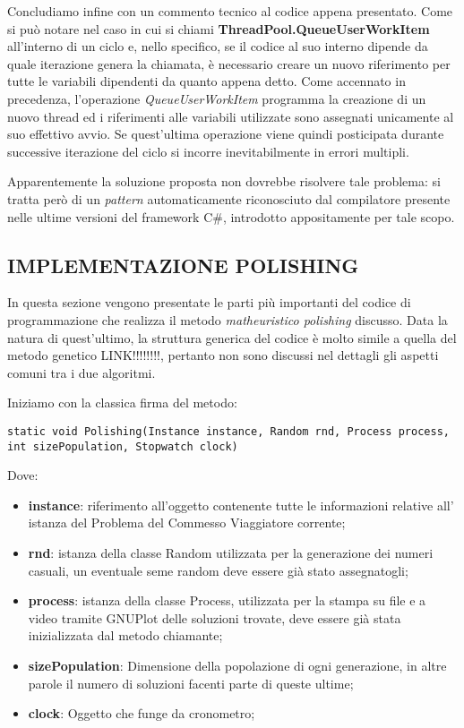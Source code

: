 \documentclass[11pt]{article}
\begin{document}
Concludiamo infine con un commento tecnico al codice appena presentato. Come si può notare nel caso in cui si chiami \textbf{ThreadPool.QueueUserWorkItem} all'interno di un ciclo e, nello specifico, se il codice al suo interno dipende da quale iterazione genera la chiamata, è necessario creare un nuovo riferimento per tutte le variabili dipendenti da quanto appena detto. Come accennato in precedenza, l'operazione \textit{QueueUserWorkItem} programma la creazione di un nuovo thread ed i riferimenti alle variabili utilizzate sono assegnati unicamente al suo effettivo avvio. Se quest'ultima operazione viene quindi posticipata durante successive iterazione del ciclo si incorre inevitabilmente in errori multipli.

Apparentemente la soluzione proposta non dovrebbe risolvere tale problema: si tratta però di un \textit{pattern} automaticamente riconosciuto dal compilatore presente nelle ultime versioni del framework C\#, introdotto appositamente per tale scopo.

\subsection*{IMPLEMENTAZIONE POLISHING}
\label{sec:ImplPolishingS}

In questa sezione vengono presentate le parti più importanti del codice di programmazione che realizza il metodo \textit{matheuristico polishing} discusso. Data la natura di quest'ultimo, la struttura generica del codice è molto simile a quella del metodo genetico LINK!!!!!!!!, pertanto non sono discussi nel dettagli gli aspetti comuni tra i due algoritmi.

Iniziamo con la classica firma del metodo:

\begin{lstlisting} 
static void Polishing(Instance instance, Random rnd, Process process, int sizePopulation, Stopwatch clock)
\end{lstlisting}

Dove:

\begin{itemize}
    \item \textbf{instance}: riferimento all'oggetto contenente tutte le informazioni relative all' istanza del Problema del Commesso Viaggiatore corrente;
    \item \textbf{rnd}: istanza della classe Random utilizzata per la generazione dei numeri casuali, un eventuale seme random deve essere già stato assegnatogli;
    \item \textbf{process}: istanza della classe Process, utilizzata per la stampa su file e a video tramite GNUPlot delle soluzioni trovate, deve essere già stata inizializzata dal metodo chiamante;
    \item \textbf{sizePopulation}: Dimensione della popolazione di ogni generazione, in altre parole il numero di soluzioni facenti parte di queste ultime;
    \item \textbf{clock}: Oggetto che funge da cronometro;
\end{itemize}
\end{document}
